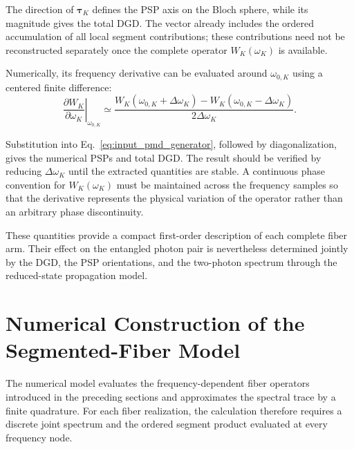 The direction of \(\boldsymbol{\tau}_K\) defines the PSP axis on the Bloch
sphere, while its magnitude gives the total DGD. The vector already includes
the ordered accumulation of all local segment contributions; these
contributions need not be reconstructed separately once the complete
operator \(W_K(\omega_K)\) is available.

Numerically, its frequency derivative can be evaluated around
\(\omega_{0,K}\) using a centered finite difference:
%
\begin{equation}
    \left.
    \frac{
        \partial W_K
    }{
        \partial\omega_K
    }
    \right|_{\omega_{0,K}}
    \simeq
    \frac{
        W_K(\omega_{0,K}+\Delta\omega_K)
        -
        W_K(\omega_{0,K}-\Delta\omega_K)
    }{
        2\Delta\omega_K
    }.
    \label{eq:finite_difference_total_operator_derivative}
\end{equation}

Substitution into Eq.~\eqref{eq:input_pmd_generator}, followed by
diagonalization, gives the numerical PSPs and total DGD. The result should
be verified by reducing \(\Delta\omega_K\) until the extracted quantities
are stable. A continuous phase convention for \(W_K(\omega_K)\) must be
maintained across the frequency samples so that the derivative represents
the physical variation of the operator rather than an arbitrary phase
discontinuity.

These quantities provide a compact first-order description of each complete
fiber arm. Their effect on the entangled photon pair is nevertheless
determined jointly by the DGD, the PSP orientations, and the two-photon
spectrum through the reduced-state propagation model.


\section{Numerical Construction of the Segmented-Fiber Model}
\label{sec:numerical_segmented_fiber_construction}

The numerical model evaluates the frequency-dependent fiber operators
introduced in the preceding sections and approximates the spectral trace by
a finite quadrature. For each fiber realization, the calculation therefore
requires a discrete joint spectrum and the ordered segment product evaluated
at every frequency node.


